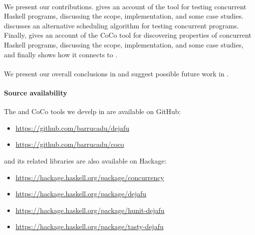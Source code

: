 \paragraph{}
We present our contributions.   gives an account of
the \dejafu{} tool for testing concurrent Haskell programs, discussing
the scope, implementation, and some case studies.
 discusses an alternative scheduling algorithm
for testing concurrent programs.  Finally,  gives an
account of the CoCo tool for discovering properties of concurrent
Haskell programs, discussing the scope, implementation, and some case
studies, and finally shows how it connects to \dejafu{}.

\paragraph{}
We present our overall conclusions in  and
suggest possible future work in .

\paragraph{Source availability}
The \dejafu{} and CoCo tools we develp in  are
available on GitHub:

\begin{itemize}
\item \url{https://github.com/barrucadu/dejafu}
\item \url{https://github.com/barrucadu/coco}
\end{itemize}

\noindent
\dejafu{} and its related libraries are also available on Hackage:

\begin{itemize}
\item \url{https://hackage.haskell.org/package/concurrency}
\item \url{https://hackage.haskell.org/package/dejafu}
\item \url{https://hackage.haskell.org/package/hunit-dejafu}
\item \url{https://hackage.haskell.org/package/tasty-dejafu}
\end{itemize}
